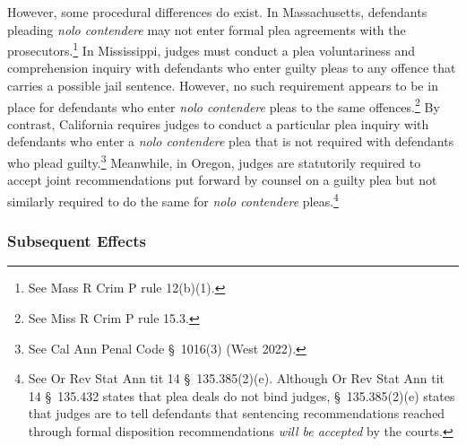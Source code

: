 However, some procedural differences do exist. In Massachusetts, defendants pleading \textit{nolo contendere} may not enter formal plea agreements with the prosecutors.\footnote{See Mass R Crim P rule 12(b)(1).} In Mississippi, judges must conduct a plea voluntariness and comprehension inquiry with defendants who enter guilty pleas to any offence that carries a possible jail sentence. However, no such requirement appears to be in place for defendants who enter \textit{nolo contendere} pleas to the same offences.\footnote{See Miss R Crim P rule 15.3.} By contrast, California requires judges to conduct a particular plea inquiry with defendants who enter a \textit{nolo contendere} plea that is not required with defendants who plead guilty.\footnote{See Cal Ann Penal Code § 1016(3) (West 2022).} Meanwhile, in Oregon, judges are statutorily required to accept joint recommendations put forward by counsel on a guilty plea but not similarly required to do the same for \textit{nolo contendere} pleas.\footnote{See Or Rev Stat Ann tit 14 § 135.385(2)(e). Although Or Rev Stat Ann tit 14 § 135.432 states that plea deals do not bind judges, § 135.385(2)(e) states that judges are to tell defendants that sentencing recommendations reached through formal disposition recommendations \textit{will be accepted} by the courts.} 

\subsubsection{Subsequent Effects}

